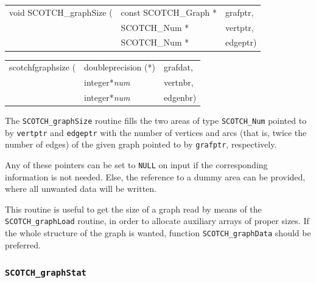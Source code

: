 \begin{itemize}
\progsyn

{\tt\begin{tabular}{l@{}ll}
void SCOTCH\_graphSize ( & const SCOTCH\_Graph * & grafptr, \\
                         & SCOTCH\_Num *         & vertptr, \\
                         & SCOTCH\_Num *         & edgeptr)
\end{tabular}}

{\tt\begin{tabular}{l@{}ll}
scotchfgraphsize ( & doubleprecision (*) & grafdat, \\
                   & integer*{\it num}   & vertnbr, \\
                   & integer*{\it num}   & edgenbr)
\end{tabular}}

\progdes

The {\tt SCOTCH\_graphSize} routine fills the two areas of type
{\tt SCOTCH\_\lbt Num} pointed to by {\tt vertptr} and {\tt edgeptr}
with the number of vertices and arcs (that is, twice the number
of edges) of the given graph pointed to by {\tt grafptr},
respectively.

Any of these pointers can be set to {\tt NULL} on input if the
corresponding information is not needed. Else, the reference to a
dummy area can be provided, where all unwanted data will be written.

This routine is useful to get the size of a graph read by means
of the {\tt SCOTCH\_\lbt graph\lbo Load} routine, in order to allocate
auxiliary arrays of proper sizes. If the whole structure of the
graph is wanted, function {\tt SCOTCH\_graph\lbo Data} should be
preferred.
\end{itemize}

\subsubsection{{\tt SCOTCH\_graphStat}}

